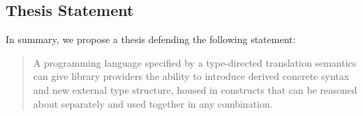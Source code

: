




\subsection{Thesis Statement}
In summary, we propose a thesis defending the following statement:
\begin{quote}
A programming language specified by a type-directed translation semantics can give library providers the ability to introduce derived concrete syntax and new external type structure, housed in constructs that can be reasoned about separately and used together in any combination.
\end{quote}






